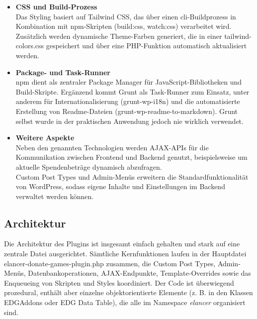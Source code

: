 \begin{itemize}
    \item \textbf{CSS und Build-Prozess}\\
    Das Styling basiert auf Tailwind CSS, das über einen \gls{cli}-Buildprozess in Kombination mit npm-Skripten (build:css, watch:css) verarbeitet wird.
    Zusätzlich werden dynamische Theme-Farben generiert, die in einer tailwind-colors.css gespeichert und über eine PHP-Funktion automatisch aktualisiert werden.

    \item \textbf{Package- und Task-Runner}\\
    npm dient als zentraler Package Manager für JavaScript-Bibliotheken und Build-Skripte.
    Ergänzend kommt Grunt als Task-Runner zum Einsatz, unter anderem für Internationalisierung (grunt-wp-i18n) und die automatisierte Erstellung von Readme-Dateien (grunt-wp-readme-to-markdown).
    Grunt selbst wurde in der praktischen Anwendung jedoch nie wirklich verwendet.

    \item \textbf{Weitere Aspekte}\\
    Neben den genannten Technologien werden AJAX-APIs für die Kommunikation zwischen Frontend und Backend genutzt, beispielsweise um aktuelle Spendenbeträge dynamisch abzufragen.\\
    Custom Post Types und Admin-Menüs erweitern die Standardfunktionalität von WordPress, sodass eigene Inhalte und Einstellungen im Backend verwaltet werden können.
\end{itemize}
\subsection{Architektur}

Die Architektur des Plugins ist insgesamt einfach gehalten und stark auf eine zentrale Datei ausgerichtet. Sämtliche Kernfunktionen laufen in der Hauptdatei elancer-donate-games-plugin.php zusammen, die Custom Post Types, Admin-Menüs, Datenbankoperationen, AJAX-Endpunkte, Template-Overrides sowie das Enqueueing von Skripten und Styles koordiniert. Der Code ist überwiegend prozedural, enthält aber einzelne objektorientierte Elemente (z. B. in den Klassen EDGAddons oder EDG Data Table), die alle im Namespace \emph{elancer} organisiert sind.


